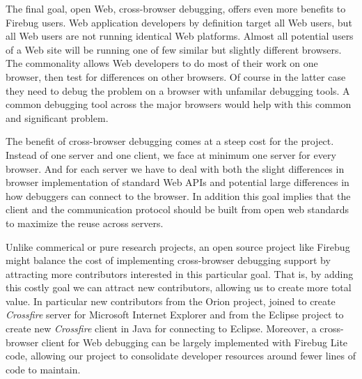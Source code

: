 The final goal, open Web, cross-browser debugging, offers even more benefits to
Firebug users.  Web application developers by definition target all Web users,
but all Web users are not running identical Web platforms. Almost all
potential users of a Web site will be running one of few similar but slightly
different browsers. The commonality allows Web developers to do most of their
work on one browser, then test for differences on other browsers. Of course in
the latter case they need to debug the problem on a browser with unfamilar debugging
tools. A common debugging tool across the major browsers would help with this
common and significant problem.

The benefit of cross-browser debugging comes at a steep cost for the project.
Instead of one server and one client, we face at minimum one server for every
browser. And for each server we have to deal with both the slight differences in
browser implementation of standard Web APIs and potential large differences in
how debuggers can connect to the browser. In addition this goal implies that the
client and the communication protocol should be built from open web standards to
maximize the reuse across servers.

Unlike commerical or pure research projects, an open source project like Firebug
might balance the cost of
implementing cross-browser debugging support by attracting more contributors
interested in this particular goal. That is, by adding this costly goal we can
attract new contributors, allowing us to create more total value. In particular
new contributors from the Orion project\cite{orion}, joined to create
\textit{Crossfire} server for Microsoft Internet Explorer and from the Eclipse
project\cite{EclipseJSDT} to create new \textit{Crossfire} client in Java for
connecting to Eclipse.   Moreover, a cross-browser client for Web debugging can be largely
implemented with Firebug Lite code, allowing our project to consolidate
developer resources around fewer lines of code to maintain.

